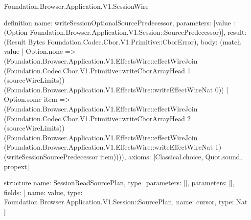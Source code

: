 \begin{lexlean}{Foundation.Browser.Application.V1.SessionWire}
\begin{semanticmodule}
definition{
  name: writeSessionOptionalSourcePredecessor,
  parameters: [value : (Option Foundation.Browser.Application.V1.Session::SourcePredecessor)],
  result: (Result Bytes Foundation.Codec.Cbor.V1.Primitive::CborError),
  body: (match value
    | Option.none => (Foundation.Browser.Application.V1.EffectsWire::effectWireJoin (Foundation.Codec.Cbor.V1.Primitive::writeCborArrayHead 1 (sourceWireLimits)) (Foundation.Browser.Application.V1.EffectsWire::writeEffectWireNat 0))
    | Option.some item => (Foundation.Browser.Application.V1.EffectsWire::effectWireJoin (Foundation.Codec.Cbor.V1.Primitive::writeCborArrayHead 2 (sourceWireLimits)) (Foundation.Browser.Application.V1.EffectsWire::effectWireJoin (Foundation.Browser.Application.V1.EffectsWire::writeEffectWireNat 1) (writeSessionSourcePredecessor item)))),
  axioms: [Classical.choice, Quot.sound, propext]
}

structure{
  name: SessionReadSourcePlan,
  type_parameters: [],
  parameters: [],
  fields: [
    {name: value, type: Foundation.Browser.Application.V1.Session::SourcePlan},
    {name: cursor, type: Nat}
  ]
}


\end{semanticmodule}
\end{lexlean}
